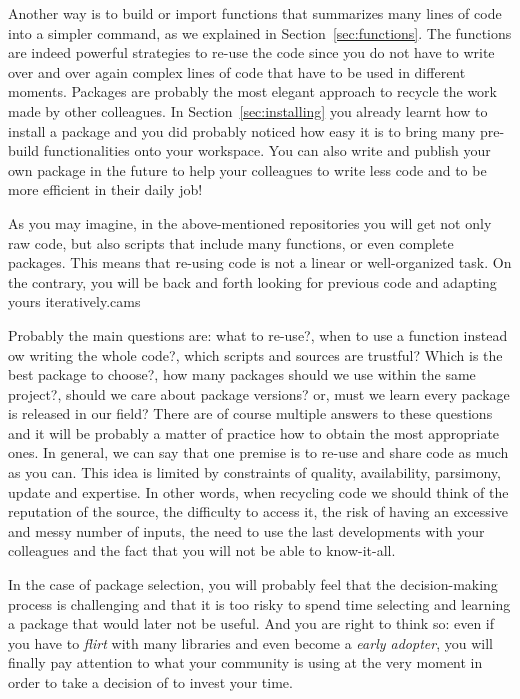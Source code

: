 Another way is to build or import functions that summarizes many lines of code into a simpler command, as we explained in Section~\ref{sec:functions}. The functions are indeed powerful strategies to re-use the code since you do not have to write over and over again complex lines of code that have to be used in different moments. Packages are probably the most elegant approach to recycle the work made by other colleagues. In Section~\ref{sec:installing} you already learnt how to install a package and you did probably noticed how easy it is to bring many pre-build functionalities onto your workspace. You can also write and publish your own package in the future to help your colleagues to write less code and to be more efficient in their daily job!

As you may imagine, in the above-mentioned repositories you will get not only raw code, but also scripts that include many functions, or even complete packages. This means that re-using code is not a linear or well-organized task. On the contrary, you will be back and forth looking for previous code and adapting yours iteratively.cams

Probably the main questions are: what to re-use?, when to use a function instead ow writing the whole code?, which scripts and sources are trustful? Which is the best package to choose?, how many packages should we use within the same project?, should we care about package versions? or, must we learn every package is released in our field? There are of course multiple answers to these questions and it will be probably a matter of practice how to obtain the most appropriate ones. In general, we can say that one premise is to re-use and share code as much as you can. This idea is limited by constraints of quality, availability, parsimony, update and expertise. In other words, when recycling code we should think of the reputation of the source, the difficulty to access it, the risk of having an excessive and messy number of inputs, the need to use the last developments with your colleagues and the fact that you will not be able to know-it-all.

In the case of package selection, you will probably feel that the decision-making process is challenging and that it is too risky to spend time selecting and learning a package that would later not be useful. And you are right to think so: even if you have to  \textit{flirt} with many libraries and even become a \textit{early adopter}, you will finally pay attention to what your community is using at the very moment in order to take a decision of to invest your time. 

